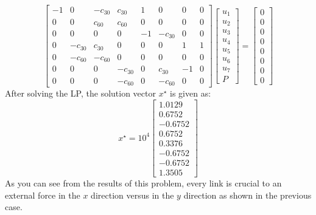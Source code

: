 \documentclass[12pt]{article}
\begin{document}
\begin{equation}
\left[
\begin{array}{cccccccc}
-1  & 0             & -c_{30}  &  c_{30}   &1     &0            &0   &0\\
0   & 0             &c_{60}     &c_{60}     &0     &0            &0   &0\\
0   &0              &0              &0              &-1    &-c_{30}  &0   &0\\
0   &-c_{30}   &c_{30}     &0              &0     &0             &1   &1\\
0   &-c_{60}   &-c_{60}    &0              &0    &0              &0   &0\\
0   & 0             &0              &-c_{30}    &0    &c_{30}    &-1  &0\\
0   &0              &0              &-c_{60}    &0    &-c_{60}   &0   &0
\end{array}
\right]
\left[
\begin{array}{c}
u_1\\
u_2\\
u_3\\
u_4\\
u_5\\
u_6\\
u_7\\
P
\end{array}
\right]
=
\left[
\begin{array}{c}
0\\
0\\
0\\
0\\
0\\
0\\
0\\
0
\end{array}
\right]
\end{equation}
After solving the LP, the solution vector $x^\star$ is given as:
\begin{equation}
\nonumber
x^\star = 10^4
\left[
\begin{array}{r}
    1.0129\\
    0.6752\\
   -0.6752\\
    0.6752\\
    0.3376\\
   -0.6752\\
   -0.6752\\
    1.3505
\end{array}
\right]
\end{equation}
As you can see from the results of this problem, every link is crucial to an external force in the $x$ direction versus in the $y$ direction as shown in the previous case.
\end{document}
